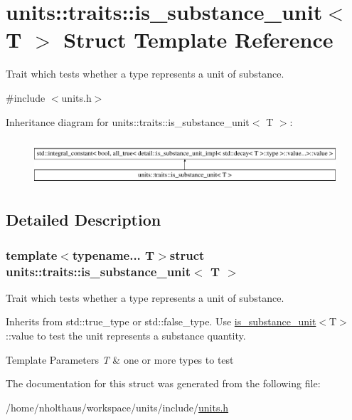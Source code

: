 \hypertarget{structunits_1_1traits_1_1is__substance__unit}{}\section{units\+:\+:traits\+:\+:is\+\_\+substance\+\_\+unit$<$ T $>$ Struct Template Reference}
\label{structunits_1_1traits_1_1is__substance__unit}


Trait which tests whether a type represents a unit of substance.  




{\ttfamily \#include $<$units.\+h$>$}

Inheritance diagram for units\+:\+:traits\+:\+:is\+\_\+substance\+\_\+unit$<$ T $>$\+:\begin{figure}[H]
\begin{center}
\leavevmode
\includegraphics[height=1.725732cm]{structunits_1_1traits_1_1is__substance__unit}
\end{center}
\end{figure}


\subsection{Detailed Description}
\subsubsection*{template$<$typename... T$>$struct units\+::traits\+::is\+\_\+substance\+\_\+unit$<$ T $>$}

Trait which tests whether a type represents a unit of substance. 

Inherits from {\ttfamily std\+::true\+\_\+type} or {\ttfamily std\+::false\+\_\+type}. Use {\ttfamily \hyperlink{structunits_1_1traits_1_1is__substance__unit}{is\+\_\+substance\+\_\+unit}$<$T$>$\+::value} to test the unit represents a substance quantity. 
\begin{DoxyTemplParams}{Template Parameters}
{\em T} & one or more types to test \\
\hline
\end{DoxyTemplParams}


The documentation for this struct was generated from the following file\+:\begin{DoxyCompactItemize}
\item 
/home/nholthaus/workspace/units/include/\hyperlink{units_8h}{units.\+h}\end{DoxyCompactItemize}
